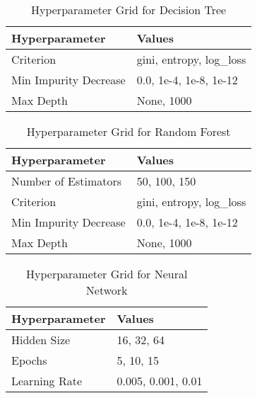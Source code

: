 \begin{table}[H]
    \centering
    \caption{Hyperparameter Grid for Decision Tree}
    \begin{tabular}{l l}
        \toprule
        \textbf{Hyperparameter} & \textbf{Values} \\
        \midrule
        Criterion & gini, entropy, log\_loss \\
        Min Impurity Decrease & 0.0, 1e-4, 1e-8, 1e-12 \\
        Max Depth & None, 1000 \\
        \bottomrule
    \end{tabular}
    \label{tab:dt_search_space}
\end{table}

\begin{table}[H]
    \centering
    \caption{Hyperparameter Grid for Random Forest}
    \begin{tabular}{l l}
        \toprule
        \textbf{Hyperparameter} & \textbf{Values} \\
        \midrule
        Number of Estimators & 50, 100, 150 \\
        Criterion & gini, entropy, log\_loss \\
        Min Impurity Decrease & 0.0, 1e-4, 1e-8, 1e-12 \\
        Max Depth & None, 1000 \\
        \bottomrule
    \end{tabular}
    \label{tab:rf_search_space}
\end{table}

\begin{table}[H]
    \centering
    \caption{Hyperparameter Grid for Neural Network}
    \begin{tabular}{l l}
        \toprule
        \textbf{Hyperparameter} & \textbf{Values} \\
        \midrule
        Hidden Size & 16, 32, 64 \\
        Epochs & 5, 10, 15 \\
        Learning Rate & 0.005, 0.001, 0.01 \\
        \bottomrule
    \end{tabular}
    \label{tab:nn_search_space}
\end{table}